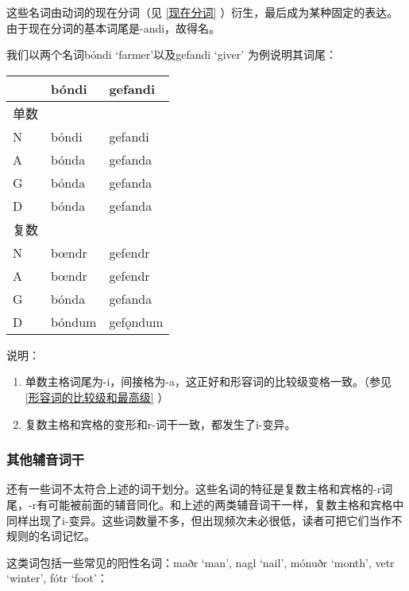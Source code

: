 这些名词由动词的现在分词（见 \ref{现在分词} ）衍生，最后成为某种固定的表达。由于现在分词的基本词尾是-andi，故得名。

我们以两个名词bóndi `farmer'以及gefandi `giver' 为例说明其词尾：

\begin{longtable}{lll}
  \toprule
     & \textbf{bóndi} & \textbf{gefandi} \\
  \midrule
  \endhead
  \bottomrule
  \endfoot
  单数 &                &                  \\
  N  & bóndi          & gefandi          \\
  A  & bónda          & gefanda          \\
  G  & bónda          & gefanda          \\
  D  & bónda          & gefanda          \\
  复数 &                &                  \\
  N  & bœndr          & gefendr          \\
  A  & bœndr          & gefendr          \\
  G  & bónda          & gefanda          \\
  D  & bóndum         & gefǫndum         \\
\end{longtable}

说明：

\begin{enumerate}
  \item
        单数主格词尾为-i，间接格为-a，这正好和形容词的比较级变格一致。（参见 \ref{形容词的比较级和最高级} ）
  \item
        复数主格和宾格的变形和r-词干一致，都发生了i-变异。
\end{enumerate}

\subsubsection{其他辅音词干}

还有一些词不太符合上述的词干划分。这些名词的特征是复数主格和宾格的-r词尾，-r有可能被前面的辅音同化。和上述的两类辅音词干一样，复数主格和宾格中同样出现了i-变异。这些词数量不多，但出现频次未必很低，读者可把它们当作不规则的名词记忆。

这类词包括一些常见的阳性名词：maðr `man', nagl `nail', mónuðr `month',
vetr `winter', fótr `foot'：

